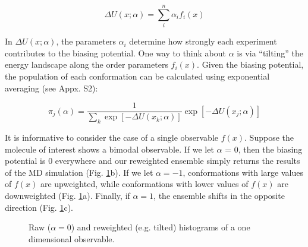 \documentclass[11pt,titlepage]{article}
\begin{document}
$$\Delta U(x;\alpha) = \sum_i^n \alpha_i f_i(x)$$

In $\Delta U(x;\alpha)$, the parameters $\alpha_i$ determine how strongly each experiment contributes to the biasing potential.  One way to think about $\alpha$ is via ``tilting'' the energy landscape along the order parameters $f_i(x)$.  Given the biasing potential, the population of each conformation can be calculated using exponential averaging (see Appx. S2):

$$\pi_j(\alpha) = \frac{1}{\sum_k \exp[-\Delta U(x_k;\alpha)]} \exp[-\Delta U(x_j;\alpha)]$$

It is informative to consider the case of a single observable $f(x)$.  Suppose the molecule of interest shows a bimodal observable.  If we let $\alpha$ = 0, then the biasing potential is $0$ everywhere and our reweighted ensemble simply returns the results of the MD simulation (Fig. \ref{figure:Hist}b).  If we let $\alpha = -1$, conformations with large values of $f(x)$ are upweighted, while conformations with lower values of $f(x)$ are downweighted (Fig. \ref{figure:Hist}a).  Finally, if $\alpha = 1$, the ensemble shifts in the opposite direction (Fig. \ref{figure:Hist}c).  

\begin{figure}

\caption{
Raw ($\alpha = 0$) and reweighted (e.g. tilted) histograms of a one dimensional observable.
}
\label{figure:Hist}
\end{figure}
\end{document}
